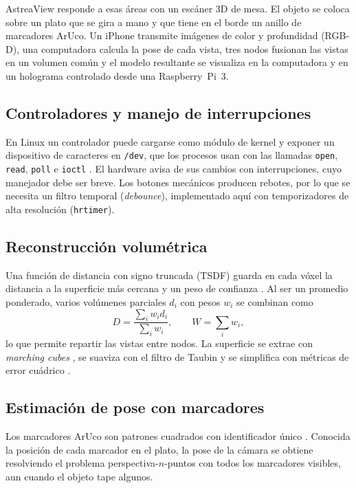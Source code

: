 \documentclass[journal]{IEEEtran}
\begin{document}
AstreaView responde a esas áreas con un escáner 3D de mesa. El objeto se coloca
sobre un plato que se gira a mano y que tiene en el borde un anillo de
marcadores ArUco. Un iPhone transmite imágenes de color y profundidad
(RGB-D), una computadora calcula la pose de cada vista, tres nodos fusionan las
vistas en un volumen común y el modelo resultante se visualiza en la
computadora y en un holograma controlado desde una Raspberry~Pi~3.

\subsection{Controladores y manejo de interrupciones}
En Linux un controlador puede cargarse como módulo de kernel y exponer un
dispositivo de caracteres en \texttt{/dev}, que los procesos usan con las
llamadas \texttt{open}, \texttt{read}, \texttt{poll} e \texttt{ioctl}
\cite{ldd3}. El hardware avisa de sus cambios con interrupciones, cuyo manejador
debe ser breve. Los botones mecánicos producen rebotes, por lo que se necesita un
filtro temporal (\emph{debounce}), implementado aquí con temporizadores de alta
resolución (\texttt{hrtimer}).

\subsection{Reconstrucción volumétrica}
Una función de distancia con signo truncada (TSDF) guarda en cada vóxel la
distancia a la superficie más cercana y un peso de confianza
\cite{curless,kinectfusion}. Al ser un promedio ponderado, varios volúmenes
parciales $d_i$ con pesos $w_i$ se combinan como
\begin{equation}
  D = \frac{\sum_i w_i d_i}{\sum_i w_i}, \qquad W = \sum_i w_i ,
\end{equation}
lo que permite repartir las vistas entre nodos. La superficie se extrae con
\emph{marching cubes} \cite{marching}, se suaviza con el filtro de Taubin
\cite{taubin} y se simplifica con métricas de error cuádrico \cite{quadric}.

\subsection{Estimación de pose con marcadores}
Los marcadores ArUco son patrones cuadrados con identificador único
\cite{aruco}. Conocida la posición de cada marcador en el plato, la pose de la
cámara se obtiene resolviendo el problema perspectiva-$n$-puntos con todos los
marcadores visibles, aun cuando el objeto tape algunos.
\end{document}
